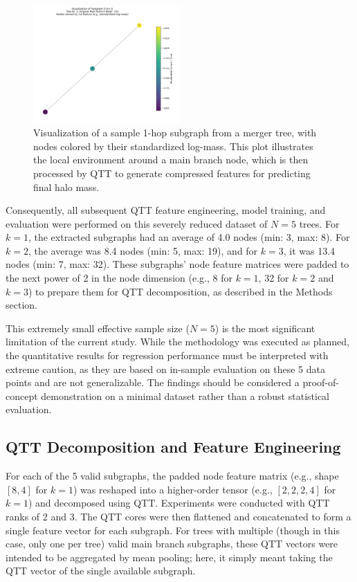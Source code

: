 \documentclass[twocolumn]{aastex631}
\begin{document}
\begin{figure}[h!]
    \centering
    \includegraphics[width=0.5\textwidth]{../input_files/plots/subgraph_vis_k1_idx0_5_20250524-175501.png}
    \caption{Visualization of a sample 1-hop subgraph from a merger tree, with nodes colored by their standardized log-mass. This plot illustrates the local environment around a main branch node, which is then processed by QTT to generate compressed features for predicting final halo mass.
}
    \label{fig:subgraph_vis}
\end{figure}

Consequently, all subsequent QTT feature engineering, model training, and evaluation were performed on this severely reduced dataset of $N=5$ trees. For $k=1$, the extracted subgraphs had an average of 4.0 nodes (min: 3, max: 8). For $k=2$, the average was 8.4 nodes (min: 5, max: 19), and for $k=3$, it was 13.4 nodes (min: 7, max: 32). These subgraphs' node feature matrices were padded to the next power of 2 in the node dimension (e.g., 8 for $k=1$, 32 for $k=2$ and $k=3$) to prepare them for QTT decomposition, as described in the Methods section.

This extremely small effective sample size ($N=5$) is the most significant limitation of the current study. While the methodology was executed as planned, the quantitative results for regression performance must be interpreted with extreme caution, as they are based on in-sample evaluation on these 5 data points and are not generalizable. The findings should be considered a proof-of-concept demonstration on a minimal dataset rather than a robust statistical evaluation.

\subsection{QTT Decomposition and Feature Engineering}

For each of the 5 valid subgraphs, the padded node feature matrix (e.g., shape $[8, 4]$ for $k=1$) was reshaped into a higher-order tensor (e.g., $[2, 2, 2, 4]$ for $k=1$) and decomposed using QTT. Experiments were conducted with QTT ranks of 2 and 3. The QTT cores were then flattened and concatenated to form a single feature vector for each subgraph. For trees with multiple (though in this case, only one per tree) valid main branch subgraphs, these QTT vectors were intended to be aggregated by mean pooling; here, it simply meant taking the QTT vector of the single available subgraph.
\end{document}
